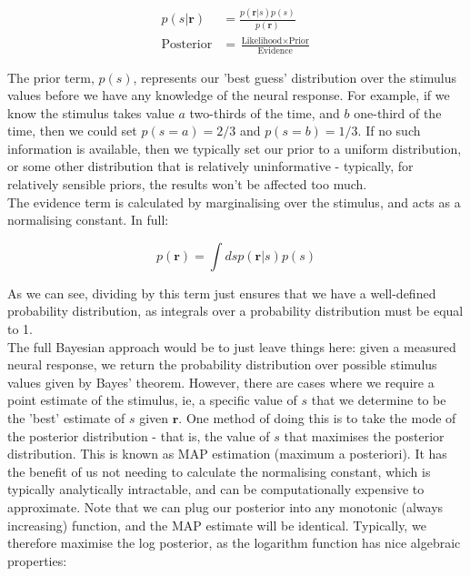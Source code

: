 \documentclass{article}
\begin{document}
\begin{align*}
	p(s|\bm{r})      & = \frac{p(\bm{r}|s)p(s)}{p(\bm{r})}                             \\[10pt]
	\text{Posterior} & = \frac{\text{Likelihood} \times \text{Prior}}{\text{Evidence}}
\end{align*}

The prior term, $p(s)$, represents our 'best guess' distribution over the stimulus values before we have any knowledge of the neural response. For example, if we know the stimulus takes value $a$ two-thirds of the time, and $b$ one-third of the time, then we could set $p(s=a)=2/3$ and $p(s=b)=1/3$. If no such information is available, then we typically set our prior to a uniform distribution, or some other distribution that is relatively uninformative - typically, for relatively sensible priors, the results won't be affected too much.\\

The evidence term is calculated by marginalising over the stimulus, and acts as a normalising constant. In full:

\begin{equation*}
	p(\bm{r}) = \int ds p(\bm{r}|s)p(s)
\end{equation*}

As we can see, dividing by this term just ensures that we have a well-defined probability distribution, as integrals over a probability distribution must be equal to 1.\\

The full Bayesian approach would be to just leave things here: given a measured neural response, we return the probability distribution over possible stimulus values given by Bayes' theorem. However, there are cases where we require a point estimate of the stimulus, ie, a specific value of $s$ that we determine to be the 'best' estimate of $s$ given $\bm{r}$. One method of doing this is to take the mode of the posterior distribution - that is, the value of $s$ that maximises the posterior distribution. This is known as MAP estimation (maximum a posteriori). It has the benefit of us not needing to calculate the normalising constant, which is typically analytically intractable, and can be computationally expensive to approximate. Note that we can plug our posterior into any monotonic (always increasing) function, and the MAP estimate will be identical. Typically, we therefore maximise the log posterior, as the logarithm function has nice algebraic properties:
\end{document}
